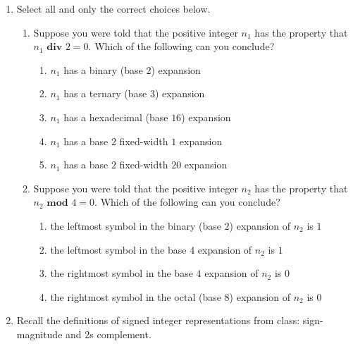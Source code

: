 \documentclass[12pt, oneside]{article}
\begin{document}
\begin{enumerate}
\item Select all and only the correct choices below.
\begin{enumerate}
\item Suppose you were told that the positive integer $n_1$ has the property that $n_1 \textbf{ div } 2 = 0$. Which of the following can you conclude?
\begin{enumerate}
\item $n_1$ has a binary (base $2$) expansion
\item $n_1$ has a ternary (base $3$) expansion
\item $n_1$ has a hexadecimal (base $16$) expansion
\item $n_1$ has a base $2$ fixed-width $1$ expansion
\item $n_1$ has a base $2$ fixed-width $20$ expansion
\end{enumerate}
\item Suppose you were told that the positive integer $n_2$ has the property that $n_2 \textbf{ mod } 4 = 0$. Which of the following can you conclude?
\begin{enumerate}
\item the leftmost symbol in the binary (base $2$) expansion of $n_2$ is $1$
\item the leftmost symbol in the base $4$ expansion of $n_2$ is $1$
\item the rightmost symbol in the base $4$ expansion of $n_2$ is $0$
\item the rightmost symbol in the octal (base $8$) expansion of $n_2$ is $0$
\end{enumerate}
\end{enumerate}
\item Recall the definitions of signed integer representations from class: sign-magnitude and 2s complement.


\end{enumerate}
\end{document}

